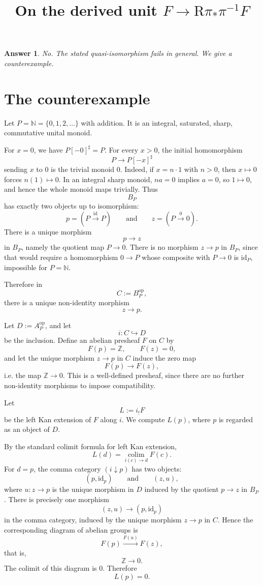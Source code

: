 \documentclass[11pt]{article}
\newtheorem*{answer}{Answer}
\begin{document}
\title{On the derived unit \(F\to \mathrm R\pi_*\pi^{-1}F\)}
\author{}
\date{}
\maketitle

\begin{answer}
No. The stated quasi-isomorphism fails in general. We give a counterexample.
\end{answer}

\section{The counterexample}

Let \(P=\mathbb N=\{0,1,2,\dots\}\) with addition. It is an integral, saturated, sharp, commutative unital monoid.

For \(x=0\), we have \(P[-0]^\sharp=P\). For every \(x>0\), the initial homomorphism
\[
P\longrightarrow P[-x]^\sharp
\]
sending \(x\) to \(0\) is the trivial monoid \(0\). Indeed, if \(x=n\cdot 1\) with \(n>0\), then \(x\mapsto 0\) forces \(n(1)\mapsto 0\). In an integral sharp monoid, \(na=0\) implies \(a=0\), so \(1\mapsto 0\), and hence the whole monoid maps trivially. Thus
\[
B_P
\]
has exactly two objects up to isomorphism:
\[
p=(P\xrightarrow{\mathrm{id}}P)
\qquad\text{and}\qquad
z=(P\xrightarrow{0}0).
\]
There is a unique morphism
\[
p\longrightarrow z
\]
in \(B_P\), namely the quotient map \(P\to 0\). There is no morphism \(z\to p\) in \(B_P\), since that would require a homomorphism \(0\to P\) whose composite with \(P\to 0\) is \(\mathrm{id}_P\), impossible for \(P=\mathbb N\).

Therefore in
\[
C:=B_P^{\mathrm{op}},
\]
there is a unique non-identity morphism
\[
z\longrightarrow p.
\]

Let \(D:=A_P^{\mathrm{op}}\), and let
\[
i:C\hookrightarrow D
\]
be the inclusion. Define an abelian presheaf \(F\) on \(C\) by
\[
F(p)=\mathbb Z,\qquad F(z)=0,
\]
and let the unique morphism \(z\to p\) in \(C\) induce the zero map
\[
F(p)\longrightarrow F(z),
\]
i.e. the map \(\mathbb Z\to 0\). This is a well-defined presheaf, since there are no further non-identity morphisms to impose compatibility.

Let
\[
L:=i_!F
\]
be the left Kan extension of \(F\) along \(i\). We compute \(L(p)\), where \(p\) is regarded as an object of \(D\).

By the standard colimit formula for left Kan extension,
\[
L(d)=\operatorname*{colim}_{i(c)\to d} F(c).
\]
For \(d=p\), the comma category \((i\downarrow p)\) has two objects:
\[
(p,\mathrm{id}_p)
\qquad\text{and}\qquad
(z,u),
\]
where \(u:z\to p\) is the unique morphism in \(D\) induced by the quotient \(p\to z\) in \(B_P\). There is precisely one morphism
\[
(z,u)\longrightarrow (p,\mathrm{id}_p)
\]
in the comma category, induced by the unique morphism \(z\to p\) in \(C\). Hence the corresponding diagram of abelian groups is
\[
F(p)\xrightarrow{F(u)} F(z),
\]
that is,
\[
\mathbb Z\longrightarrow 0.
\]
The colimit of this diagram is \(0\). Therefore
\[
L(p)=0.
\]
\end{document}
